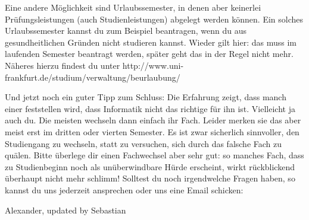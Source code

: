 Eine andere Möglichkeit sind Urlaubssemester, in denen aber keinerlei Prüfungsleistungen (auch Studienleistungen) abgelegt werden können. Ein solches Urlaubssemester kannst du zum Beispiel beantragen, wenn du aus gesundheitlichen Gründen nicht studieren kannst. Wieder gilt hier: das muss im laufenden Semester beantragt werden, später geht das in der Regel nicht mehr. Näheres hierzu findest du unter http://www.uni-frankfurt.de/studium/verwaltung/beurlaubung/


Und jetzt noch ein guter Tipp zum Schluss: Die Erfahrung zeigt, dass manch einer feststellen wird, dass Informatik nicht das richtige für ihn ist. Vielleicht ja auch du. Die meisten wechseln dann einfach ihr Fach. Leider merken sie das aber meist erst im dritten oder vierten Semester. Es ist zwar sicherlich sinnvoller, den Studiengang zu wechseln, statt zu versuchen, sich durch das falsche Fach zu quälen. Bitte überlege dir einen Fachwechsel aber sehr gut: so manches Fach, dass zu Studienbeginn noch als unüberwindbare Hürde erscheint, wirkt rückblickend überhaupt nicht mehr schlimm! Solltest du noch irgendwelche Fragen haben, so kannst du uns jederzeit ansprechen oder uns eine Email schicken: \emailfachschaft


\begin{flushright} Alexander, updated by Sebastian \end{flushright}
